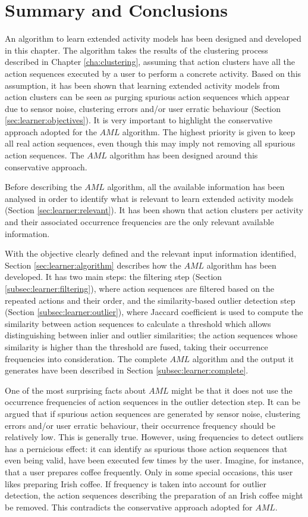\section{Summary and Conclusions}
\label{sec:learner:summary}

An algorithm to learn extended activity models has been designed and developed in this chapter. The algorithm takes the results of the clustering process described in Chapter \ref{cha:clustering}, assuming that action clusters have all the action sequences executed by a user to perform a concrete activity. Based on this assumption, it has been shown that learning extended activity models from action clusters can be seen as purging spurious action sequences which appear due to sensor noise, clustering errors and/or user erratic behaviour (Section \ref{sec:learner:objectives}). It is very important to highlight the conservative approach adopted for the $AML$ algorithm. The highest priority is given to keep all real action sequences, even though this may imply not removing all spurious action sequences. The $AML$ algorithm has been designed around this conservative approach.

Before describing the $AML$ algorithm, all the available information has been analysed in order to identify what is relevant to learn extended activity models (Section \ref{sec:learner:relevant}). It has been shown that action clusters per activity and their associated occurrence frequencies are the only relevant available information.

With the objective clearly defined and the relevant input information identified, Section \ref{sec:learner:algorithm} describes how the $AML$ algorithm has been developed. It has two main steps: the filtering step (Section \ref{subsec:learner:filtering}), where action sequences are filtered based on the repeated actions and their order, and the similarity-based outlier detection step (Section \ref{subsec:learner:outlier}), where Jaccard coefficient is used to compute the similarity between action sequences to calculate a threshold which allows distinguishing between inlier and outlier similarities; the action sequences whose similarity is higher than the threshold are fused, taking their occurrence frequencies into consideration. The complete $AML$ algorithm and the output it generates have been described in Section \ref{subsec:learner:complete}. 

One of the most surprising facts about $AML$ might be that it does not use the occurrence frequencies of action sequences in the outlier detection step. It can be argued that if spurious action sequences are generated by sensor noise, clustering errors and/or user erratic behaviour, their occurrence frequency should be relatively low. This is generally true. However, using frequencies to detect outliers has a pernicious effect: it can identify as spurious those action sequences that even being valid, have been executed few times by the user. Imagine, for instance, that a user prepares coffee frequently. Only in some special occasions, this user likes preparing Irish coffee. If frequency is taken into account for outlier detection, the action sequences describing the preparation of an Irish coffee might be removed. This contradicts the conservative approach adopted for $AML$.


